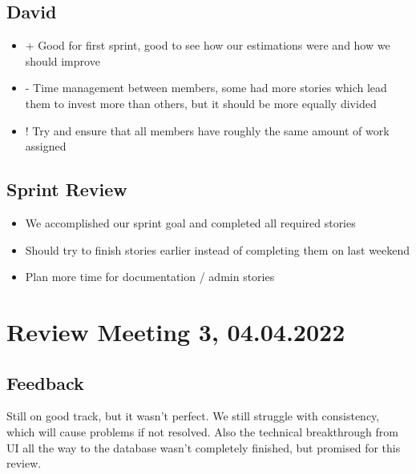 \subsection{David}
\begin{itemize}
    \item + Good for first sprint, good to see how our estimations were and how we should improve
    \item - Time management between members, some had more stories which lead them to invest more than others, but it should be more equally divided
    \item ! Try and ensure that all members have roughly the same amount of work assigned
\end{itemize}

\subsection{Sprint Review}
\begin{itemize}
    \item We accomplished our sprint goal and completed all required stories
    \item Should try to finish stories earlier instead of completing them on last weekend
    \item Plan more time for documentation / admin stories
\end{itemize}


\section{Review Meeting 3, 04.04.2022}

\subsection{Feedback}
Still on good track, but it wasn't perfect.
We still struggle with consistency, which will cause problems if not resolved.
Also the technical breakthrough from UI all the way to the database wasn't completely finished, but promised for this review.


